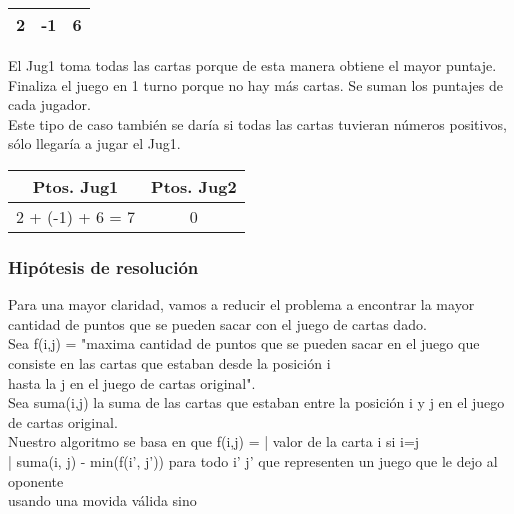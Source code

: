 \documentclass[11pt, a4paper, twoside]{article}
\begin{document}
\begin{ejemplo}\hspace{0em}

	\begin{center}
	  \begin{tabular}{|c|c|c|}
		  \hline
		   2 & -1 & 6 \\
		  \hline
	  \end{tabular} 
	\end{center} 

El Jug1 toma todas las cartas porque de esta manera obtiene el mayor puntaje. \\
Finaliza el juego en 1 turno porque no hay más cartas. Se suman los puntajes de cada jugador.\\
Este tipo de caso también se daría si todas las cartas tuvieran números positivos, sólo llegaría a jugar el Jug1.\\

	\begin{center}
	  \begin{tabular}{|c|c|}
		  \hline
		  Ptos. Jug1 & Ptos. Jug2 \\
		  \hline
		  2 + (-1) + 6 = 7 & 0 \\
		  \hline
	  \end{tabular}
	\end{center} 	
	
\end{ejemplo}



\subsubsection{Hipótesis de resolución}
Para una mayor claridad, vamos a reducir el problema a encontrar la mayor cantidad de puntos que se pueden sacar con el juego de cartas dado.\\
Sea f(i,j) = "maxima cantidad de puntos que se pueden sacar en el juego que consiste en las cartas que estaban desde la posición i \\
hasta la j en el juego de cartas original".\\
Sea suma(i,j) la suma de las cartas que estaban entre la posición i y j en el juego de cartas original.\\
Nuestro algoritmo se basa en que f(i,j) =   | valor de la carta i      si i=j\\
                                            | suma(i, j) - min(f(i', j')) para todo i' j' que representen un juego que le dejo al oponente\\
                                              usando una movida válida        sino\\
\\
\end{document}
